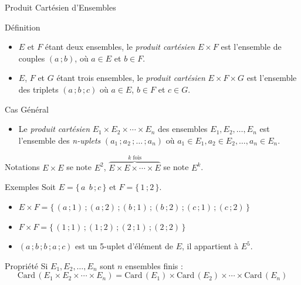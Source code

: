 \documentclass{coursbook}
\begin{document}
    \begin{Gpartie}{Produit Cartésien d'Ensembles}
        \begin{Spartie}{Définition}
            \begin{itemize}
                \item $E$ et $F$ étant deux ensembles, le \emph{produit cartésien} $E\times F$ est l'ensemble de couples $(a\,; b)$, où $a\in E$ et $b\in F$.
                \item $E$, $F$ et $G$ étant trois ensembles, le \emph{produit cartésien} $E\times F\times G$ est l'ensemble des triplets $(a\,; b\,; c)$ où $a\in E$, $b\in F$ et $c\in G$.
            \end{itemize}
            \begin{SSpartie}{Cas Général}
                \begin{itemize}
                    \item Le \emph{produit cartésien} $E_1\times E_2\times\dotsb\times E_n$ des ensembles $E_1, E_2,\dotsc,E_n$ est l'ensemble des \emph{n-uplets} $(a_1\,; a_2\,;\dotsc\,; a_n)$ où $a_1\in E_1,a_2\in E_2,\dotsc,a_n\in E_n$.
                \end{itemize}
            \end{SSpartie}
        \end{Spartie}
        \begin{Spartie}{Notations}
            $E\times E$ se note $E^2$, $\overbrace{E\times E\times\dotsb\times E}^\text{$k$ fois}$ se note $E^k$.
        \end{Spartie}
        \begin{Spartie}{Exemples}
            Soit $E=\big\{\, a\;\, b\,; c\,\big\}$ et $F=\big\{\,1\,; 2\,\big\}$.
            \begin{itemize}
                \item $E\times F=\big\{\,(a\,; 1)\,;(a\,; 2)\,; (b\,; 1)\,; (b\,; 2)\,; (c\,; 1)\,; (c\,; 2)\,\big\}$
                \item $F\times F=\big\{\,(1\,; 1)\,; (1\,; 2)\,; (2\,; 1)\,; (2\,; 2)\,\big\}$
                \item $(a\,; b\,; b\,; a\,; c)$ est un 5-uplet d'élément de $E$, il appartient à $E^5$.
            \end{itemize}
        \end{Spartie}
        \begin{Spartie}{Propriété}
            Si $E_1,E_2,\dotsc,E_n$ sont $n$ ensembles finis :
            \[\mathrm{Card}\,(E_1\times E_2\times\dotsb\times E_n)=\mathrm{Card}\,(E_1)\times\mathrm{Card}\,(E_2)\times\dotsb\times\mathrm{Card}\,(E_n)\]

\end{Spartie}
\end{Gpartie}
\end{document}
